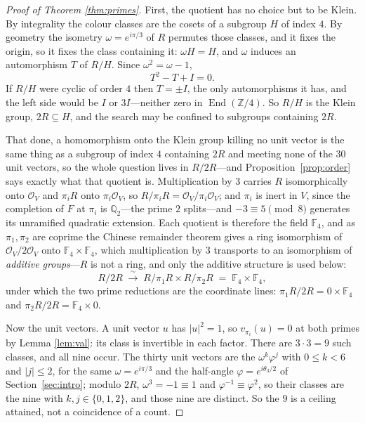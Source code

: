 \documentclass[11pt,reqno]{amsart}
\theoremstyle{plain}
\theoremstyle{definition}
\newcommand{\Z}{\mathbb{Z}}
\newcommand{\Q}{\mathbb{Q}}
\newcommand{\F}{\mathbb{F}}
\newcommand{\Lat}{R}
\newcommand{\Ok}{\mathcal{O}}
\begin{document}
\begin{proof}[Proof of Theorem \ref{thm:primes}]
First, the quotient has no choice but to be Klein. By integrality the colour
classes are the cosets of a subgroup $H$ of index $4$. By geometry the isometry
$\omega = e^{i\pi/3}$ of $\Lat$ permutes those classes, and it fixes the origin,
so it fixes the class containing it: $\omega H = H$, and $\omega$ induces an
automorphism $T$ of $\Lat/H$. Since $\omega^2 = \omega - 1$,
\[
  T^2 - T + I = 0 .
\]
If $\Lat/H$ were cyclic of order $4$ then $T = \pm I$, the only automorphisms it
has, and the left side would be $I$ or $3I$---neither zero in $\operatorname{End}(\Z/4)$. So
$\Lat/H$ is the Klein group, $2\Lat \subseteq H$, and the search may be confined to
subgroups containing $2\Lat$.

That done, a homomorphism onto the Klein group killing no unit vector is the same
thing as a subgroup of index $4$ containing $2\Lat$ and meeting none of the $30$
unit vectors, so the whole question lives in $\Lat/2\Lat$---and
Proposition~\ref{prop:order} says exactly what that quotient is. Multiplication by
$3$ carries $\Lat$ isomorphically onto $\Ok_V$ and $\pi_i\Lat$ onto
$\pi_i\Ok_V$, so $\Lat/\pi_i\Lat = \Ok_V/\pi_i\Ok_V$; and $\pi_i$ is inert in
$V$, since the completion of $F$ at $\pi_i$ is $\Q_2$---the prime $2$ splits---and
$-3 \equiv 5 \pmod 8$ generates its unramified quadratic extension. Each quotient
is therefore the field $\F_4$, and as $\pi_1, \pi_2$ are coprime the Chinese
remainder theorem gives a ring isomorphism of $\Ok_V/2\Ok_V$ onto
$\F_4 \times \F_4$, which multiplication by $3$ transports to an isomorphism of
\emph{additive groups}---$\Lat$ is not a ring, and only the additive structure is
used below:
\[
  \Lat/2\Lat \;\xrightarrow{\ \sim\ }\; \Lat/\pi_1\Lat \times \Lat/\pi_2\Lat
  \;=\; \F_4 \times \F_4 ,
\]
under which the two prime reductions are the coordinate lines:
$\pi_1\Lat/2\Lat = 0 \times \F_4$ and $\pi_2\Lat/2\Lat = \F_4 \times 0$.

Now the unit vectors. A unit vector $u$ has $\lvert u \rvert^2 = 1$, so
$v_{\pi_i}(u) = 0$ at both primes by Lemma \ref{lem:val}: its class is invertible
in each factor. There are $3 \cdot 3 = 9$ such classes, and all nine occur. The
thirty unit vectors are the $\omega^k\varphi^j$ with $0 \le k < 6$ and
$\lvert j \rvert \le 2$, for the same $\omega = e^{i\pi/3}$ and the half-angle
$\varphi = e^{i\theta_3/2}$ of Section~\ref{sec:intro}; modulo $2\Lat$,
$\omega^3 = -1 \equiv 1$ and $\varphi^{-1} \equiv \varphi^2$, so their classes are
the nine with $k, j \in \{0,1,2\}$, and those nine are distinct. So the $9$ is a ceiling
attained, not a coincidence of a count.


\end{proof}
\end{document}

